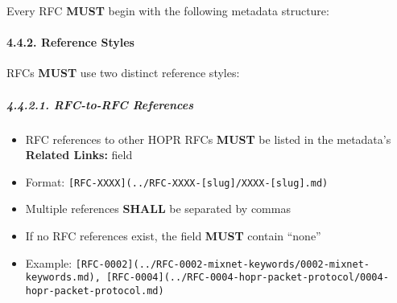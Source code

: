 Every RFC \textbf{MUST} begin with the following metadata structure:

\begin{Shaded}
\begin{Highlighting}[]

\SpecialStringTok{{-} }
\SpecialStringTok{{-} }\CommentTok{[}\CommentTok{]}
\SpecialStringTok{{-} }
\SpecialStringTok{{-} }\CommentTok{[}\CommentTok{]}
\SpecialStringTok{{-} }
\SpecialStringTok{{-} }
\SpecialStringTok{{-} }
\SpecialStringTok{{-} }
\SpecialStringTok{{-} }\CommentTok{[}\CommentTok{](../RFC{-}XXXX{-}[slug]/XXXX{-}[slug].md)}
\end{Highlighting}
\end{Shaded}

\paragraph{4.4.2. Reference Styles}\label{reference-styles}

RFCs \textbf{MUST} use two distinct reference styles:

\subparagraph{4.4.2.1. RFC-to-RFC
References}\label{rfc-to-rfc-references}

\begin{itemize}
\tightlist
\item
  RFC references to other HOPR RFCs \textbf{MUST} be listed in the
  metadata's \textbf{Related Links:} field
\item
  Format:
  \texttt{{[}RFC-XXXX{]}(../RFC-XXXX-{[}slug{]}/XXXX-{[}slug{]}.md)}
\item
  Multiple references \textbf{SHALL} be separated by commas
\item
  If no RFC references exist, the field \textbf{MUST} contain ``none''
\item
  Example:
  \texttt{{[}RFC-0002{]}(../RFC-0002-mixnet-keywords/0002-mixnet-keywords.md),\ {[}RFC-0004{]}(../RFC-0004-hopr-packet-protocol/0004-hopr-packet-protocol.md)}
\end{itemize}

